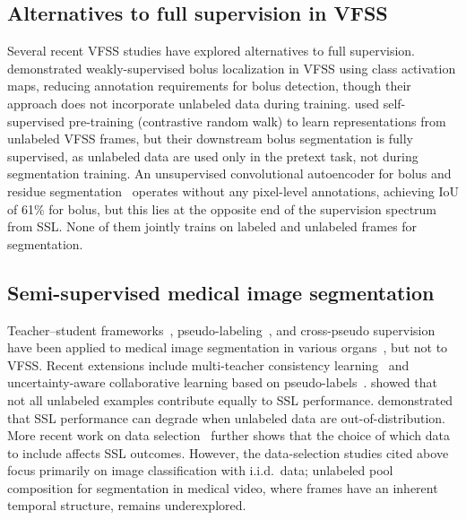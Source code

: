 \documentclass[a4paper,fleqn]{cas-dc}
\begin{document}
\subsection{Alternatives to full supervision in VFSS}

Several recent VFSS studies have explored alternatives to full supervision.
\citet{ref_bandini2022} demonstrated weakly-supervised bolus localization in VFSS using class activation maps, reducing annotation requirements for bolus detection, though their approach does not incorporate unlabeled data during training.
\citet{ref_martinovic2025} used self-supervised pre-training (contrastive random walk) to learn representations from unlabeled VFSS frames, but their downstream bolus segmentation is fully supervised, as unlabeled data are used only in the pretext task, not during segmentation training.
An unsupervised convolutional autoencoder for bolus and residue segmentation~\citep{ref_unsup_bolus2025} operates without any pixel-level annotations, achieving IoU of 61\% for bolus, but this lies at the opposite end of the supervision spectrum from SSL.
None of them jointly trains on labeled and unlabeled frames for segmentation.


\subsection{Semi-supervised medical image segmentation}

Teacher--student frameworks~\citep{ref_mean_teacher}, pseudo-labeling~\citep{ref_fixmatch}, and cross-pseudo supervision~\citep{ref_cps} have been applied to medical image segmentation in various organs~\citep{ref_ssl_survey,ref_han2024}, but not to VFSS. Recent extensions include multi-teacher consistency learning~\citep{ref_qiu2025} and uncertainty-aware collaborative learning based on pseudo-labels~\citep{ref_wang2026}.
\citet{ref_ren2020} showed that not all unlabeled examples contribute equally to SSL performance.
\citet{ref_oliver2018} demonstrated that SSL performance can degrade when unlabeled data are out-of-distribution.
More recent work on data selection~\citep{ref_rdss2024} further shows that the choice of which data to include affects SSL outcomes.
However, the data-selection studies cited above focus primarily on image classification with i.i.d.\ data; unlabeled pool composition for segmentation in medical video, where frames have an inherent temporal structure, remains underexplored.
\end{document}

